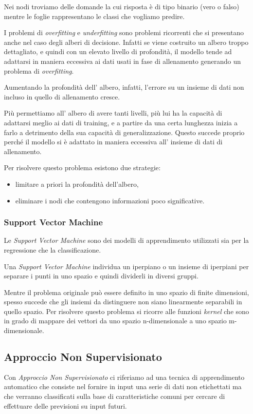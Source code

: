 \documentclass[a4paper,12pt]{report}
\begin{document}
Nei nodi troviamo delle domande la cui risposta è di tipo binario (vero o falso) mentre le foglie rappresentano le classi che vogliamo predire.

I problemi di \textit{overfitting} e \textit{underfitting} sono problemi ricorrenti che si presentano anche nel caso degli alberi di decisione. Infatti se viene costruito un albero troppo dettagliato, e quindi con un elevato livello di profondità, il modello tende ad adattarsi in maniera eccessiva ai dati usati in fase di allenamento generando un problema di \textit{overfitting}.

Aumentando la profondità dell' albero, infatti, l'errore su un insieme di dati non incluso in quello di allenamento cresce.

Più permettiamo all’ albero di avere tanti livelli, più lui ha la capacità di adattarsi meglio ai dati di training, e a partire da una certa lunghezza inizia a farlo a detrimento della sua capacità di generalizzazione. Questo succede proprio perché il modello si è adattato in maniera eccessiva all’ insieme di dati di allenamento.

Per risolvere questo problema esistono due strategie:
\begin{itemize}
    \item limitare a priori la profondità dell'albero, 
    \item eliminare i nodi che contengono informazioni poco significative.
\end{itemize}

\subsubsection{Support Vector Machine}
Le \textit{Support Vector Machine} sono dei modelli di apprendimento utilizzati sia per la regressione che la classificazione.

Una \textit{Support Vector Machine} individua un iperpiano o un insieme di iperpiani per separare i punti in uno spazio e quindi dividerli in diversi gruppi.

Mentre il problema originale può essere definito in uno spazio di finite dimensioni, spesso succede che gli insiemi da distinguere non siano linearmente separabili in quello spazio. Per risolvere questo problema si ricorre alle funzioni \textit{kernel} che sono in grado di mappare dei vettori da uno spazio n-dimensionale a uno spazio m-dimensionale.

\subsection*{Approccio Non Supervisionato}
Con \textit{Approccio Non Supervisionato} ci riferiamo ad una tecnica di apprendimento automatico che consiste nel fornire in input una serie di dati non etichettati ma che verranno classificati sulla base di caratteristiche comuni  per cercare di effettuare delle previsioni su input futuri.
\end{document}

